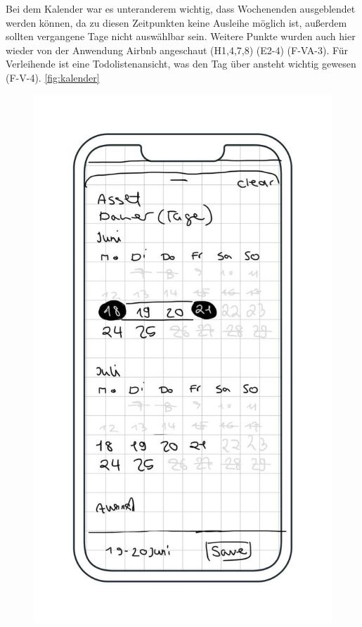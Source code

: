 Bei dem Kalender war es unteranderem wichtig, dass Wochenenden ausgeblendet werden können, da zu
diesen Zeitpunkten keine Ausleihe möglich ist, außerdem sollten vergangene Tage nicht auswählbar
sein. Weitere Punkte wurden auch hier wieder von der Anwendung Airbnb angeschaut (H1,4,7,8) (E2-4)
(F-VA-3). Für Verleihende ist eine Todolistenansicht, was den Tag über ansteht wichtig
gewesen (F-V-4). \ref{fig:kalender}

\begin{figure}[h]
    \centering
    \includegraphics[scale=0.37]{Bilder/Mockups/Kalender.jpg}

\end{figure}
